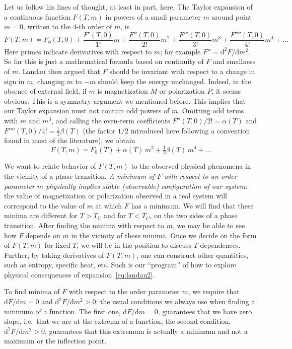\documentclass[11pt,a4paper]{article}
\begin{document}
Let us follow his lines of thought, at least in part, here. The Taylor expansion
of a continuous function $F(T,m)$ in powers of a small parameter $m$ around point
$m = 0$, written to the 4-th order of $m$, is
\begin{equation}
  F(T,m) = F_0(T,0) + \frac{F'(T,0)}{1!}m + \frac{F''(T,0)}{2!}m^{2}
         + \frac{F'''(T,0)}{3!}m^{3} + \frac{F''''(T,0)}{4!}m^{4} + \dots
\end{equation}
Here primes indicate derivatives with respect to $m$; for example
$F'' = \mathrm{d}^2F/\mathrm{d}m^2$. So far this is just a mathematical formula
based on continuity of $F$ and smallness of $m$. Landau then argued that $F$
should be invariant with respect to a change in sign in $m$: changing $m$ to
$-m$ should keep the energy unchanged. Indeed, in the absence of external field,
if $m$ is magnetization $M$ or polarization $P$, it seems obvious. This is a
symmetry argument we mentioned before. This implies that our Taylor expansion must
not contain odd powers of $m$. Omitting odd terms with $m$ and $m^3$, and calling
the even-term coefficients
$F''(T,0)/2! = \alpha(T)$ and $F''''(T,0)/4! = \tfrac{1}{2}\beta(T)$ (the factor
$1/2$ introduced here following a convention found in most of the literature), we
obtain
\begin{equation}\label{eq:landau2}
  F(T,m) = F_0(T) + \alpha(T)\,m^{2} + \tfrac{1}{2}\beta(T)\,m^{4} + \dots
\end{equation}

We want to relate behavior of $F(T,m)$ to the observed physical phenomena in the
vicinity of a phase transition. \emph{A minimum of $F$ with respect to an order
parameter $m$ physically implies stable (observable) configuration of our system}:
the value of magnetization or polarization observed in a real system will
correspond to the value of $m$ at which $F$ has a minimum. We will find that these
minima are different for $T > T_C$ and for $T < T_C$, on the two sides of a phase
transition. After finding the minima with respect to $m$, we may be able to see
how $F$ depends on $m$ in the vicinity of these minima. Once we decide on the form
of $F(T,m)$ for fixed $T$, we will be in the position to discuss $T$-dependences.
Further, by taking derivatives of $F(T,m)$, one can construct other quantities,
such as entropy, specific heat, etc. Such is our ``program'' of how to explore
physical consequences of expansion~\eqref{eq:landau2}.

To find minima of $F$ with respect to the order parameter $m$, we require that
$\mathrm{d}F/\mathrm{d}m = 0$ and $\mathrm{d}^2F/\mathrm{d}m^2 > 0$: the usual
conditions we always use when finding a minimum of a function. The first one,
$\mathrm{d}F/\mathrm{d}m = 0$, guarantees that we have zero slope, i.e.\ that we
are at the extrema of a function; the second condition,
$\mathrm{d}^2F/\mathrm{d}m^2 > 0$, guarantees that this extremum is actually a
minimum and not a maximum or the inflection point.
\end{document}
